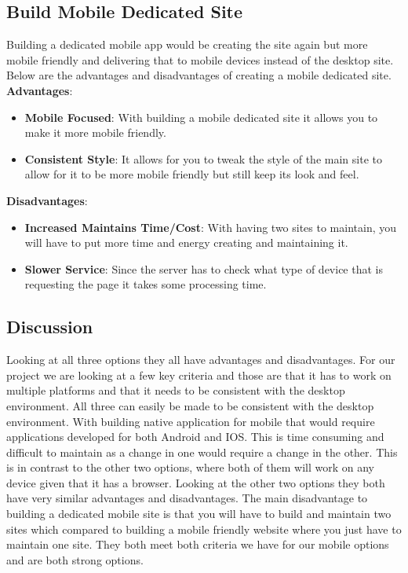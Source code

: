 	\subsection{Build Mobile Dedicated Site}
	Building a dedicated mobile app would be creating the site again but more
	mobile friendly and delivering that to mobile devices instead of the desktop
	site. Below are the advantages and disadvantages of creating a mobile dedicated site.
	\textbf{Advantages}:
	\begin{itemize}
		\item \textbf{Mobile Focused}: With building a mobile dedicated site it allows
		you to make it more mobile friendly.
		\item \textbf{Consistent Style}: It allows for you to tweak the style of the
		main site to allow for it to be more mobile friendly but still keep its look
		and feel.
	\end{itemize}
	\textbf{Disadvantages}:
	\begin{itemize}
		\item \textbf{Increased Maintains Time/Cost}: With having two sites to maintain,
		you will have to put more time and energy creating and maintaining it.
		\item \textbf{Slower Service}: Since the server has to check what type of
		device that is requesting the page it takes some processing time.
	\end{itemize}
	\subsection{Discussion}
	Looking at all three options they all have advantages and disadvantages. For
	our project we are looking at a few key criteria and those are that it has to
	work on multiple platforms and that it needs to be consistent with the desktop
	environment. All three can easily be made to be consistent with the desktop
	environment. With building native application for mobile that would require
	applications developed for both Android and IOS. This is time consuming and
	difficult to maintain as a change in one would require a change in the other.
	This is in contrast to the other two options, where both of them will work on any device
	given that it has a browser. Looking at the other two options they both have very
	similar advantages and disadvantages. The main disadvantage to building a dedicated
	mobile site is that you will have to build and maintain two sites which compared to
	building a mobile friendly website where you just have to maintain one site.
	They both meet both criteria we have for our mobile options and are both strong
	options.
